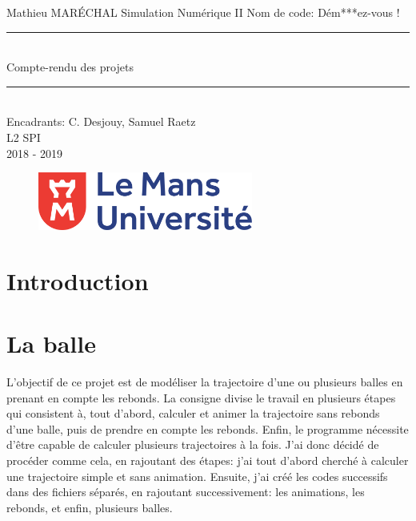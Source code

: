 \documentclass[a4paper,11pt]{article}
\begin{document}
	\begin{titlepage}
		\begin{center}
			\huge{Mathieu MARÉCHAL}
			\vskip 3cm
			\Huge Simulation Numérique II
			\vskip 0.25cm
			\Large{Nom de code: Dém***ez-vous !}
			\vskip 3.5cm
						\rule{\linewidth}{0.5mm}\vspace{6mm}\\
			\textbf{\Huge{}}
			\Huge{Compte-rendu des projets}
						\rule{\linewidth}{0.5mm}\vspace{3mm}\\
			\vskip 4.5cm
			\LARGE{Encadrants: C. Desjouy, Samuel Raetz\\L2 SPI\\ 2018 - 2019\\}
			\vskip 2cm
			\begin{figure}[H]
			\centering
  						\includegraphics[width=200pt]{logo_univlemans.png}
			\end{figure}
		\end{center}
	    \newpage	
	    \setcounter{figure}{0}
	\end{titlepage}
	
\newpage

\section*{Introduction}


\tableofcontents
\newpage

\section{La balle}

L'objectif de ce projet est de modéliser la trajectoire d'une ou plusieurs balles en prenant en compte les rebonds. La consigne divise le travail en plusieurs étapes qui consistent à, tout d'abord, calculer et animer la trajectoire sans rebonds d'une balle, puis de prendre en compte les rebonds. Enfin, le programme nécessite d'être capable de calculer plusieurs trajectoires à la fois. J'ai donc décidé de procéder comme cela, en rajoutant des étapes: j'ai tout d'abord cherché à calculer une trajectoire simple et sans animation. Ensuite, j'ai créé les codes successifs dans des fichiers séparés, en rajoutant successivement: les animations, les rebonds, et enfin, plusieurs balles.
\end{document}
